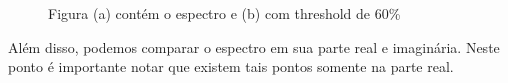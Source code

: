 \documentclass{article}
\begin{document}
	\begin{figure}[H]
		\centering
		\qquad
		\caption{Figura (a) contém o espectro e (b) com threshold de 60\%} 
	\end{figure}
	
	Além disso, podemos comparar o espectro em sua parte real e imaginária. Neste ponto é importante notar que existem tais pontos somente na parte real. 
	
\end{document}
